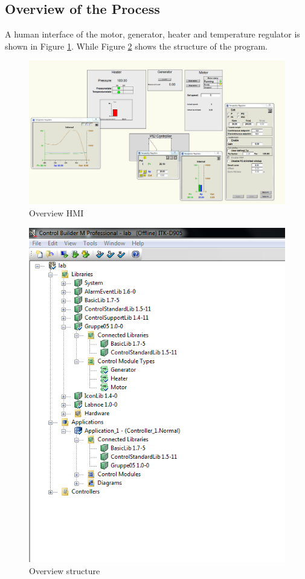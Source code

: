 \subsection{Overview of the Process}
A human interface of the motor, generator, heater and temperature regulator is shown in Figure \ref{Overview2}. While Figure \ref{Overview} shows the structure of the program.

\begin{figure}[!htb]
    \centerline{\includegraphics[scale=0.35]{images/overview2}}
    \caption{Overview HMI}
    \label{Overview2}
\end{figure}


\begin{figure}[!htb]
    \includegraphics[scale=0.7]{images/overview}
    \caption{Overview structure}
    \label{Overview}
\end{figure}


